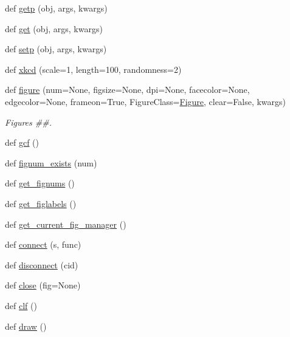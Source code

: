 \begin{DoxyCompactItemize}
\item 
def \hyperlink{namespacematplotlib_1_1pyplot_a37192e3d4a4956663e32ade008323c67}{getp} (obj, args, kwargs)
\item 
def \hyperlink{namespacematplotlib_1_1pyplot_ae426592d9ea324ce6c0ded568f349492}{get} (obj, args, kwargs)
\item 
def \hyperlink{namespacematplotlib_1_1pyplot_aefe6ffadf5b9f1c2b6f530cf0a9590ee}{setp} (obj, args, kwargs)
\item 
def \hyperlink{namespacematplotlib_1_1pyplot_a624b39398a7ee2d744eb1fc7048bfdd7}{xkcd} (scale=1, length=100, randomness=2)
\item 
def \hyperlink{namespacematplotlib_1_1pyplot_a78e7f62ac1eee7f67da0f01e0461a18a}{figure} (num=None, figsize=None, dpi=None, facecolor=None, edgecolor=None, frameon=True, Figure\+Class=\hyperlink{classmatplotlib_1_1figure_1_1Figure}{Figure}, clear=False, kwargs)
\begin{DoxyCompactList}\small\item\em Figures \#\#. \end{DoxyCompactList}\item 
def \hyperlink{namespacematplotlib_1_1pyplot_aef22f981e45053fcae200518ec4a7b25}{gcf} ()
\item 
def \hyperlink{namespacematplotlib_1_1pyplot_a8f267fb3312e891f5b756ca6dc256eca}{fignum\+\_\+exists} (num)
\item 
def \hyperlink{namespacematplotlib_1_1pyplot_a360d294428c7095e3f3743aa17a9d65c}{get\+\_\+fignums} ()
\item 
def \hyperlink{namespacematplotlib_1_1pyplot_a8a01efa66eeded35b31c5b6e30e0a5e5}{get\+\_\+figlabels} ()
\item 
def \hyperlink{namespacematplotlib_1_1pyplot_ac6d35057e0a407371c0a0ddd8048da89}{get\+\_\+current\+\_\+fig\+\_\+manager} ()
\item 
def \hyperlink{namespacematplotlib_1_1pyplot_a67d896e6dcaa15337699458beba54d11}{connect} (s, func)
\item 
def \hyperlink{namespacematplotlib_1_1pyplot_a15f618539c417d800504a0b7896a9876}{disconnect} (cid)
\item 
def \hyperlink{namespacematplotlib_1_1pyplot_ab3ecb1d03935c8ab87b4629a19b21109}{close} (fig=None)
\item 
def \hyperlink{namespacematplotlib_1_1pyplot_ac5db7fbf4e6074954aedee52f73bb91d}{clf} ()
\item 
def \hyperlink{namespacematplotlib_1_1pyplot_a428e77435c3452dcc641907c995d7601}{draw} ()
\item 

\end{DoxyCompactItemize}
